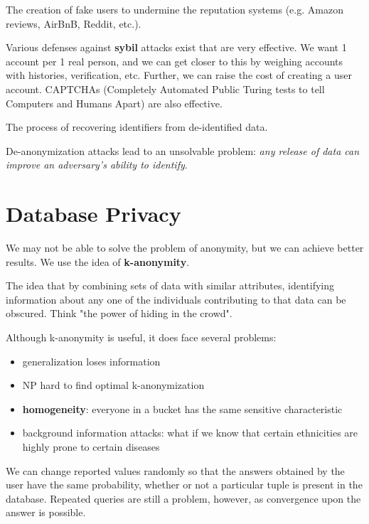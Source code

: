 \begin{definition}
    The creation of fake users to undermine the reputation systems (e.g. Amazon reviews, AirBnB, Reddit, etc.).
\end{definition}

Various defenses against \textbf{sybil} attacks exist that are very effective. We want 1 account per 1 real person, and we can get closer to this by weighing accounts with histories, verification, etc. Further, we can raise the cost of creating a user account. CAPTCHAs (Completely Automated Public Turing tests to tell Computers and Humans Apart) are also effective.

\begin{definition}
    The process of recovering identifiers from de-identified data.
\end{definition}

De-anonymization attacks lead to an unsolvable problem: \emph{any release of data can improve an adversary's ability to identify}.

\section{Database Privacy}
We may not be able to solve the problem of anonymity, but we can achieve better results. We use the idea of \textbf{k-anonymity}.

\begin{definition}[k-Anonymity]
    The idea that by combining sets of data with similar attributes, identifying information about any one of the individuals contributing to that data can be obscured. Think "the power of hiding in the crowd".
\end{definition}

Although k-anonymity is useful, it does face several problems:
\begin{itemize}
    \item generalization loses information
    \item NP hard to find optimal k-anonymization
    \item \textbf{homogeneity}: everyone in a bucket has the same sensitive characteristic
    \item background information attacks: what if we know that certain ethnicities are highly prone to certain diseases
\end{itemize}

We can change reported values randomly so that the answers obtained by the user have the same probability, whether or not a particular tuple is present in the database. Repeated queries are still a problem, however, as convergence upon the answer is possible.